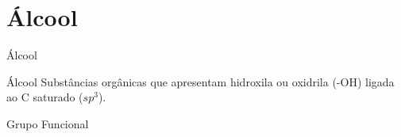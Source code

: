 \documentclass[presentation,professionalfonts,aspectratio=169]{beamer}
\begin{document}
\section{Álcool}
\label{sec:org8e9583b}
\begin{frame}[label={sec:org5f72865}]{Álcool}
\begin{mybox}{Álcool}
Substâncias  orgânicas  que  apresentam  hidroxila  ou oxidrila (-OH) ligada ao C saturado (\(sp^3\)).


  \begin{center}
Grupo Funcional
 \end{center}

\end{mybox}
\end{frame}
\end{document}
